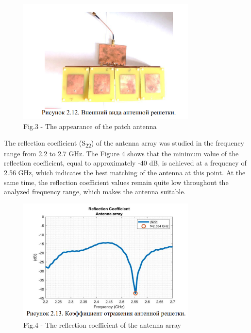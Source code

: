 \begin{figure}[H]
	\centering
	\includegraphics[width=0.8\textwidth]{media/ict/image43}
	\caption*{Fig.3 - The appearance of the patch antenna}
\end{figure}

\begin{multicols}{2}
The reflection coefficient (S\textsubscript{22}) of the antenna array
was studied in the frequency range from 2.2 to 2.7 GHz. The Figure 4
shows that the minimum value of the reflection coefficient, equal to
approximately -40 dB, is achieved at a frequency of 2.56 GHz, which
indicates the best matching of the antenna at this point. At the same
time, the reflection coefficient values \hspace{0pt}\hspace{0pt}remain
quite low throughout the analyzed frequency range, which makes the
antenna suitable.
\end{multicols}

\begin{figure}[H]
	\centering
	\includegraphics[width=0.8\textwidth]{media/ict/image44}
	\caption*{Fig.4 - The reflection coefficient of the antenna array}
\end{figure}

